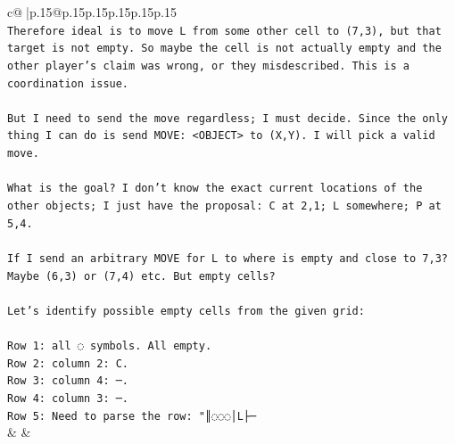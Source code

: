 \documentclass{article}
\begin{document}
{\begin{supertabular}{c@{$\;$}|p{.15\linewidth}@{}p{.15\linewidth}p{.15\linewidth}p{.15\linewidth}p{.15\linewidth}p{.15\linewidth}}
{{{\\ 
\texttt{Therefore ideal is to move L from some other cell to (7,3), but that target is not empty. So maybe the cell is not actually empty and the other player's claim was wrong, or they misdescribed. This is a coordination issue.} \\
\\ 
\texttt{But I need to send the move regardless; I must decide. Since the only thing I can do is send MOVE: <OBJECT> to (X,Y). I will pick a valid move.} \\
\\ 
\texttt{What is the goal? I don't know the exact current locations of the other objects; I just have the proposal: C at 2,1; L somewhere; P at 5,4.  } \\
\\ 
\texttt{If I send an arbitrary MOVE for L to where is empty and close to 7,3? Maybe (6,3) or (7,4) etc. But empty cells?  } \\
\\ 
\texttt{Let's identify possible empty cells from the given grid:} \\
\\ 
\texttt{Row 1: all ◌ symbols. All empty.  } \\
\texttt{Row 2: column 2: C.  } \\
\texttt{Row 3: column 4: ─.  } \\
\texttt{Row 4: column 3: ─.  } \\
\texttt{Row 5: Need to parse the row: "║◌◌◌│L├─} \\
            }
        }
    }
    & & \\ \\


\end{supertabular}}
\end{document}
